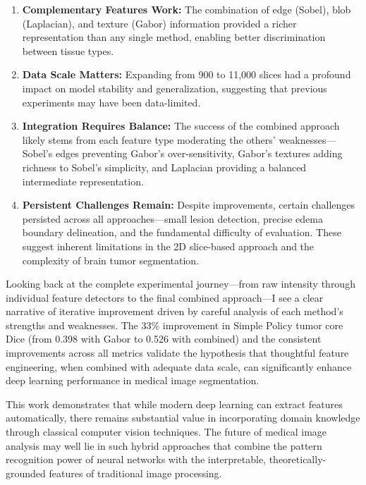 \begin{enumerate}
    \item \textbf{Complementary Features Work:} The combination of edge (Sobel), blob (Laplacian), and texture (Gabor) information provided a richer representation than any single method, enabling better discrimination between tissue types.

    \item \textbf{Data Scale Matters:} Expanding from 900 to 11,000 slices had a profound impact on model stability and generalization, suggesting that previous experiments may have been data-limited.

    \item \textbf{Integration Requires Balance:} The success of the combined approach likely stems from each feature type moderating the others' weaknesses—Sobel's edges preventing Gabor's over-sensitivity, Gabor's textures adding richness to Sobel's simplicity, and Laplacian providing a balanced intermediate representation.

    \item \textbf{Persistent Challenges Remain:} Despite improvements, certain challenges persisted across all approaches—small lesion detection, precise edema boundary delineation, and the fundamental difficulty of evaluation. These suggest inherent limitations in the 2D slice-based approach and the complexity of brain tumor segmentation.
\end{enumerate}


Looking back at the complete experimental journey—from raw intensity through individual feature detectors to the final combined approach—I see a clear narrative of iterative improvement driven by careful analysis of each method's strengths and weaknesses. The 33\% improvement in Simple Policy tumor core Dice (from 0.398 with Gabor to 0.526 with combined) and the consistent improvements across all metrics validate the hypothesis that thoughtful feature engineering, when combined with adequate data scale, can significantly enhance deep learning performance in medical image segmentation.

This work demonstrates that while modern deep learning can extract features automatically, there remains substantial value in incorporating domain knowledge through classical computer vision techniques. The future of medical image analysis may well lie in such hybrid approaches that combine the pattern recognition power of neural networks with the interpretable, theoretically-grounded features of traditional image processing.



